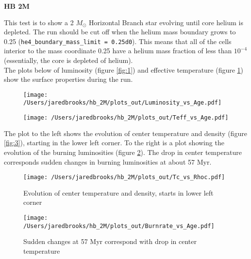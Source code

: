 \documentclass{article}
\begin{document}
	
	\begin{center}
	  \begin{Large}
	    \textbf{HB 2M}\\
	  \end{Large}
	\end{center}

        This test is to show a 2 $M_\odot$ Horizontal Branch star evolving until core helium is depleted.  The run should be cut off when the helium mass boundary grows to 0.25 (\texttt{he4\_boundary\_mass\_limit = 0.25d0}).  This means that all of the cells interior to the mass coordinate 0.25 have a helium mass fraction of less than $10^{-4}$ (essentially, the core is depleted of helium).\\

        The plots below of luminosity (figure \ref{fig:1}) and effective temperature (figure \ref{fig:2}) show the surface properties during the run.

        \begin{figure}[H]
          \begin{minipage}[b]{0.5\linewidth}
	    \centering
	    \texttt{[image: /Users/jaredbrooks/hb\_2M/plots\_out/Luminosity\_vs\_Age.pdf]}
	    \caption{}
	    \label{fig:1}
          \end{minipage}
          \hspace{0cm}
          \begin{minipage}[b]{0.5\linewidth}
            \centering
            \texttt{[image: /Users/jaredbrooks/hb\_2M/plots\_out/Teff\_vs\_Age.pdf]}
            \caption{}
            \label{fig:2}
          \end{minipage}
	\end{figure}

        \pagebreak

        The plot to the left shows the evolution of center temperature and density (figure \ref{fig:3}), starting in the lower left corner.  To the right is a plot showing the evolution of the burning luminosities (figure \ref{fig:4}).  The drop in center temperature corresponds sudden changes in burning luminosities at about 57 Myr.

        \begin{figure}[H]
          \begin{minipage}[b]{0.5\linewidth}
            \centering
            \texttt{[image: /Users/jaredbrooks/hb\_2M/plots\_out/Tc\_vs\_Rhoc.pdf]}
            \caption{Evolution of center temperature and density, starts in lower left corner}
            \label{fig:3}
          \end{minipage}
          \hspace{0cm}
          \begin{minipage}[b]{0.5\linewidth}
            \centering
            \texttt{[image: /Users/jaredbrooks/hb\_2M/plots\_out/Burnrate\_vs\_Age.pdf]}
            \caption{Sudden changes at 57 Myr correspond with drop in center temperature}
            \label{fig:4}
          \end{minipage}
        \end{figure}
\end{document}
